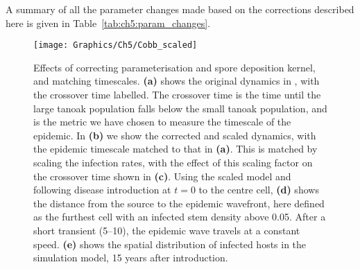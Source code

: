 A summary of all the parameter changes made based on the corrections described here is given in Table~\ref{tab:ch5:param_changes}.

\begin{figure}[h]
    \begin{center}
        \texttt{[image: Graphics/Ch5/Cobb\_scaled]}
        \caption[Effect of model reparameterisation and infection rate scaling]{Effects of correcting parameterisation and spore deposition kernel, and matching timescales. \textbf{(a)} shows the original dynamics in \citet{cobb_ecosystem_2012}, with the crossover time labelled. The crossover time is the time until the large tanoak population falls below the small tanoak population, and is the metric we have chosen to measure the timescale of the epidemic. In \textbf{(b)} we show the corrected and scaled dynamics, with the epidemic timescale matched to that in \textbf{(a)}. This is matched by scaling the infection rates, with the effect of this scaling factor on the crossover time shown in \textbf{(c)}. Using the scaled model and following disease introduction at $t=0$ to the centre cell, \textbf{(d)} shows the distance from the source to the epidemic wavefront, here defined as the furthest cell with an infected stem density above 0.05. After a short transient (\texttildelow\SIrange{5}{10}{\years}), the epidemic wave travels at a constant speed. \textbf{(e)} shows the spatial distribution of infected hosts in the simulation model, 15 years after introduction.\label{fig:ch5:inf_scaling}}
    \end{center}
\end{figure}

